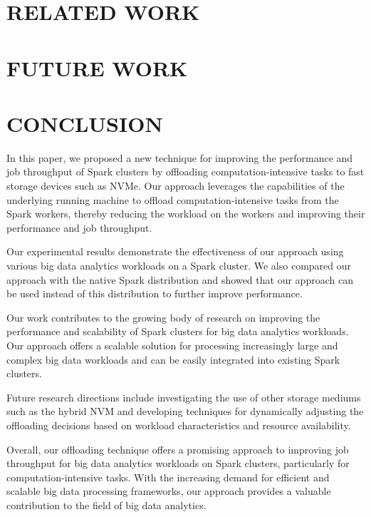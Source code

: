 \documentclass[twocolumn,10pt]{asme2e}
\begin{document}
\subsection*{}

\section*{RELATED WORK}

\section*{FUTURE WORK}

\section*{CONCLUSION}

In this paper, we proposed a new technique for improving the performance and job throughput of Spark clusters by offloading computation-intensive tasks to fast storage devices such as NVMe. Our approach leverages the capabilities of the underlying running machine to offload computation-intensive tasks from the Spark workers, thereby reducing the workload on the workers and improving their performance and job throughput.

Our experimental results demonstrate the effectiveness of our approach using various big data analytics workloads on a Spark cluster. We also compared our approach with the native Spark distribution and showed that our approach can be used instead of this distribution to further improve performance.

Our work contributes to the growing body of research on improving the performance and scalability of Spark clusters for big data analytics workloads. Our approach offers a scalable solution for processing increasingly large and complex big data workloads and can be easily integrated into existing Spark clusters.

Future research directions include investigating the use of other storage mediums such as the hybrid NVM and developing techniques for dynamically adjusting the offloading decisions based on workload characteristics and resource availability.

Overall, our offloading technique offers a promising approach to improving job throughput for big data analytics workloads on Spark clusters, particularly for computation-intensive tasks. With the increasing demand for efficient and scalable big data processing frameworks, our approach provides a valuable contribution to the field of big data analytics.
\end{document}
